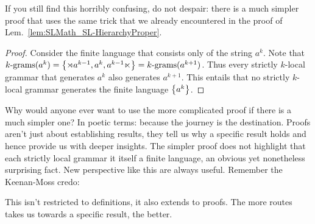 If you still find this horribly confusing, do not despair:
there is a much simpler proof that uses the same trick that we already encountered in the proof of Lem.~\ref{lem:SLMath_SL-HierarchyProper}.
%
\begin{proof}
    Consider the finite language that consists only of the string $a^k$.
    Note that $\Bigrams[k](a^k) = \setof{\LeftEdge a^{k-1}, a^k, a^{k-1} \RightEdge} = \Bigrams[k](a^{k+1})$.
    Thus every strictly $k$-local grammar that generates $a^k$ also generates $a^{k+1}$.
    This entails that no strictly $k$-local grammar generates the finite language $\setof{a^k}$.
\end{proof}
%
Why would anyone ever want to use the more complicated proof if there is a much simpler one?
In poetic terms: because the journey is the destination.
Proofs aren't just about establishing results, they tell us why a specific result holds and hence provide us with deeper insights.
The simpler proof does not highlight that each strictly local grammar it itself a finite language, an obvious yet nonetheless surprising fact.
New perspective like this are always useful.
Remember the Keenan-Moss credo:
%
\begin{center}
\end{center}
%
This isn't restricted to definitions, it also extends to proofs.
The more routes takes us towards a specific result, the better.


